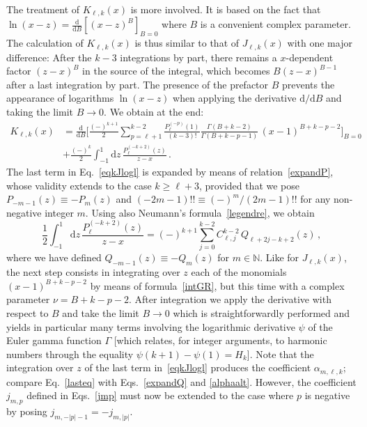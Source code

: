 \documentclass[prd,preprint,superscriptaddress,tightenlines,nofootinbib,
  eqsecnum,showpacs]{revtex4}
\newcommand{\ud}{\mathrm{d}}
\begin{document}
The treatment of $K_{\ell,k}(x)$ is more involved. It is based on the
fact that $\ln(x-z)=\frac{\ud}{\ud B}[(x-z)^B]_{B=0}$ where $B$ is a
convenient complex parameter. The calculation of $K_{\ell,k}(x)$ is
thus similar to that of $J_{\ell,k}(x)$ with one major difference:
After the $k-3$ integrations by part, there remains a $x$-dependent
factor $(z-x)^B$ in the source of the integral, which becomes $B
(z-x)^{B-1}$ after a last integration by part. The presence of the
prefactor $B$ prevents the appearance of logarithms $\ln (x-z)$ when
applying the derivative $\ud/\ud B$ and taking the limit $B \to 0$. We
obtain at the end:
%
\begin{align} \label{eqkJlogl}
 K_{\ell,k}(x) &= \frac{\ud}{\ud
   B}\biggl[\frac{(-)^{k+1}}{2}\sum_{p=\ell+1}^{k-2}
   \frac{P^{(-p)}_\ell(1)}{(k-3)!}
   \frac{\Gamma(B+k-2)}{\Gamma(B+k-p-1)}\,(x-1)^{B+k-p-2}\biggr]_{B=0}
 \nonumber \\ & + \frac{(-)^k}{2} \int_{-1}^1 \ud z\,
 \frac{P^{(-k+2)}_\ell(z)}{z-x} \,.
\end{align}
%
The last term in Eq.~\eqref{eqkJlogl} is expanded by means of
relation~\eqref{expandP}, whose validity extends to the case $k
\geqslant \ell+3$, provided that we pose $P_{-m-1}(z) \equiv
-P_{m}(z)$ and $(-2m-1)!! \equiv (-)^m/(2m-1)!!$ for any non-negative
integer $m$. Using also Neumann's formula~\eqref{legendre}, we obtain
%
\begin{equation}\label{lasteq}
\frac{1}{2} \int_{-1}^1 \ud z\, \frac{P^{(-k+2)}_\ell(z)}{z-x} =
(-)^{k+1} \sum_{j=0}^{k-2} C_{\ell,j}^{k-2}\,Q_{\ell+2j-k+2}(z)\,,
\end{equation}
%
where we have defined $Q_{-m-1}(z) \equiv -Q_{m}(z)$ for
$m\in\mathbb{N}$. Like for $J_{\ell,k}(x)$, the next step consists in
integrating over $z$ each of the monomials $(x-1)^{B+k-p-2}$ by means
of formula~\eqref{intGR}, but this time with a complex parameter
$\nu=B+k-p-2$. After integration we apply the derivative with respect
to $B$ and take the limit $B\to 0$ which is straightforwardly
performed and yields in particular many terms involving the
logarithmic derivative $\psi$ of the Euler gamma function $\Gamma$
[which relates, for integer arguments, to harmonic numbers through the
  equality $\psi(k+1) -\psi(1)= H_k$]. Note that the integration over
$z$ of the last term in~\eqref{eqkJlogl} produces the coefficient
$\alpha_{m,\ell,k}$; compare Eq.~\eqref{lasteq} with
Eqs.~\eqref{expandQ} and \eqref{alphaalt}. However, the coefficient
$j_{m,p}$ defined in Eqs.~\eqref{jmp} must now be extended to the case
where $p$ is negative by posing $j_{m, -|p| -1} = -j_{m, |p|}$.
\end{document}
